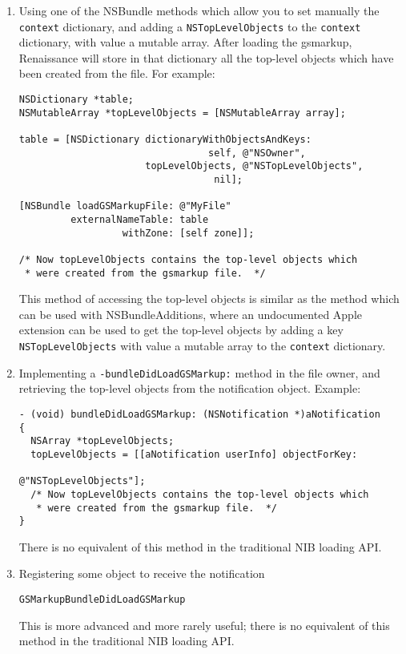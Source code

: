 \begin{enumerate}
\item Using one of the NSBundle methods which allow you to set
  manually the \texttt{context} dictionary, and adding a
  \texttt{NSTopLevelObjects} to the \texttt{context} dictionary, with
  value a mutable array.  After loading the gsmarkup, Renaissance will
  store in that dictionary all the top-level objects which have been
  created from the file.  For example:
\begin{verbatim}
NSDictionary *table;
NSMutableArray *topLevelObjects = [NSMutableArray array];

table = [NSDictionary dictionaryWithObjectsAndKeys: 
                                 self, @"NSOwner",
                      topLevelObjects, @"NSTopLevelObjects",
                                  nil];

[NSBundle loadGSMarkupFile: @"MyFile"
         externalNameTable: table
                  withZone: [self zone]];

/* Now topLevelObjects contains the top-level objects which
 * were created from the gsmarkup file.  */
\end{verbatim}
  This method of accessing the top-level objects is similar as the
  method which can be used with NSBundleAdditions, where an
  undocumented Apple extension can be used to get the top-level
  objects by adding a key \texttt{NSTopLevelObjects} with value a
  mutable array to the \texttt{context} dictionary.

\item Implementing a \texttt{-bundleDidLoadGSMarkup:} method in the
  file owner, and retrieving the top-level objects from the
  notification object.  Example:
\begin{verbatim}
- (void) bundleDidLoadGSMarkup: (NSNotification *)aNotification
{
  NSArray *topLevelObjects;
  topLevelObjects = [[aNotification userInfo] objectForKey: 
                                                  @"NSTopLevelObjects"];
  /* Now topLevelObjects contains the top-level objects which
   * were created from the gsmarkup file.  */
}
\end{verbatim}
  There is no equivalent of this method in the traditional NIB loading
  API.

\item Registering some object to receive the notification
\begin{verbatim}
GSMarkupBundleDidLoadGSMarkup
\end{verbatim}
  This is more advanced and more rarely useful; there is no equivalent
  of this method in the traditional NIB loading API.
\end{enumerate}

